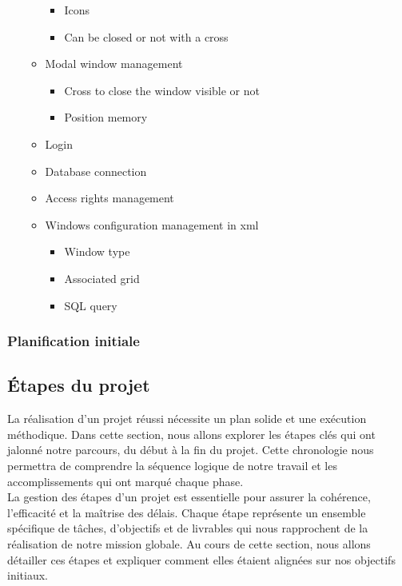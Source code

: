 \documentclass[a4paper, 12pt, french]{article}
\newcommand{\bdotoutlined}{\item[\color{ssiYellow}\ding{109}]}
\newcommand{\bsquare}{\item[\color{ssiYellow}\ding{110}]}
\begin{document}
\begin{itemize}
\begin{itemize}
\begin{itemize}
										\bsquare{Icons}
										\bsquare{Can be closed or not with a cross}
									\end{itemize}
								\bdotoutlined{Modal window management}
									\begin{itemize}
										\bsquare{Cross to close the window visible or not}
										\bsquare{Position memory}
									\end{itemize}
								\bdotoutlined{Login}
								\bdotoutlined{Database connection}
								\bdotoutlined{Access rights management}
								\bdotoutlined{Windows configuration management in xml}
									\begin{itemize}
										\bsquare{Window type}
										\bsquare{Associated grid}
										\bsquare{SQL query}
									\end{itemize}
							\end{itemize}
					\end{itemize}

				\subsubsection{Planification initiale}
						
			\subsection{Étapes du projet}
				La réalisation d'un projet réussi nécessite un plan solide et une exécution méthodique. Dans cette section, nous allons explorer les étapes clés qui ont jalonné notre parcours, du début à la fin du projet. Cette chronologie nous permettra de comprendre la séquence logique de notre travail et les accomplissements qui ont marqué chaque phase.\\

				La gestion des étapes d'un projet est essentielle pour assurer la cohérence, l'efficacité et la maîtrise des délais. Chaque étape représente un ensemble spécifique de tâches, d'objectifs et de livrables qui nous rapprochent de la réalisation de notre mission globale. Au cours de cette section, nous allons détailler ces étapes et expliquer comment elles étaient alignées sur nos objectifs initiaux.

\end{document}
